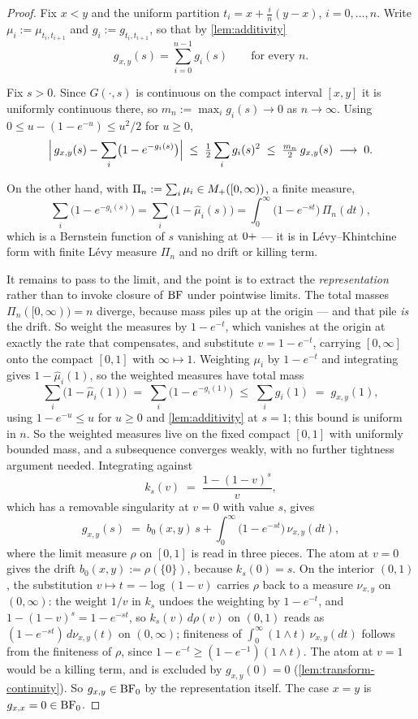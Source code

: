\begin{proof}
\leanok
Fix $x < y$ and the uniform partition $t_i = x + \tfrac{i}{n}(y - x)$, $i = 0, \dots, n$.
Write $\mu_i := \mu_{t_i, t_{i+1}}$ and $g_i := g_{t_i, t_{i+1}}$, so that by
\ref{lem:additivity}
\[
  g_{x,y}(s) = \sum_{i=0}^{n-1} g_i(s) \qquad \text{for every } n.
\]

Fix $s > 0$. Since $G(\cdot, s)$ is continuous on the compact interval $[x, y]$ it is
uniformly continuous there, so $m_n := \max_i g_i(s) \to 0$ as $n \to \infty$. Using
$0 \le u - (1 - e^{-u}) \le u^2/2$ for $u \ge 0$,
\[
  \Bigl|\, g_{x,y}(s) - \sum_{i}\bigl(1 - e^{-g_i(s)}\bigr) \Bigr|
  \;\le\; \tfrac12 \sum_i g_i(s)^2
  \;\le\; \tfrac{m_n}{2}\, g_{x,y}(s)
  \;\longrightarrow\; 0 .
\]

On the other hand, with $\Pi_n := \sum_i \mu_i \in M_+([0,\infty))$, a finite measure,
\[
  \sum_i \bigl(1 - e^{-g_i(s)}\bigr) = \sum_i \bigl(1 - \hat\mu_i(s)\bigr)
  = \int_0^\infty \bigl(1 - e^{-st}\bigr)\,\Pi_n(dt),
\]
which is a Bernstein function of $s$ vanishing at $0{+}$ --- it is in Lévy--Khintchine form
with finite Lévy measure $\Pi_n$ and no drift or killing term.

It remains to pass to the limit, and the point is to extract the \emph{representation} rather
than to invoke closure of $\mathrm{BF}$ under pointwise limits. The total masses $\Pi_n([0,\infty)) = n$
diverge, because mass piles up at the origin --- and that pile \emph{is} the drift. So weight the
measures by $1 - e^{-t}$, which vanishes at the origin at exactly the rate that compensates, and
substitute $v = 1 - e^{-t}$, carrying $[0,\infty]$ onto the compact $[0,1]$ with
$\infty \mapsto 1$. Weighting $\mu_i$ by $1 - e^{-t}$ and integrating gives $1 - \hat\mu_i(1)$, so
the weighted measures have total mass
\[
  \sum_i \bigl(1 - \hat\mu_i(1)\bigr) \;=\; \sum_i \bigl(1 - e^{-g_i(1)}\bigr)
  \;\le\; \sum_i g_i(1) \;=\; g_{x,y}(1),
\]
using $1 - e^{-u} \le u$ for $u \ge 0$ and \ref{lem:additivity} at $s = 1$; this bound is uniform
in $n$. So the weighted measures live on the fixed compact $[0,1]$ with uniformly bounded mass,
and a subsequence converges weakly, with no further tightness argument needed. Integrating
against
\[
  k_s(v) \;=\; \frac{1 - (1-v)^s}{v},
\]
which has a removable singularity at $v = 0$ with value $s$, gives
\[
  g_{x,y}(s) \;=\; b_0(x,y)\,s + \int_0^\infty \bigl(1 - e^{-st}\bigr)\,\nu_{x,y}(dt),
\]
where the limit measure $\rho$ on $[0,1]$ is read in three pieces. The atom at $v = 0$ gives the
drift $b_0(x,y) := \rho(\{0\})$, because $k_s(0) = s$. On the interior $(0,1)$, the substitution
$v \mapsto t = -\log(1-v)$ carries $\rho$ back to a measure $\nu_{x,y}$ on $(0,\infty)$: the
weight $1/v$ in $k_s$ undoes the weighting by $1 - e^{-t}$, and $1 - (1-v)^s = 1 - e^{-st}$, so
$k_s(v)\,d\rho(v)$ on $(0,1)$ reads as $(1 - e^{-st})\,d\nu_{x,y}(t)$ on $(0,\infty)$; finiteness
of $\int_0^\infty (1 \wedge t)\,\nu_{x,y}(dt)$ follows from the finiteness of $\rho$, since
$1 - e^{-t} \ge (1 - e^{-1})(1 \wedge t)$. The atom at $v = 1$ would be a killing term, and is
excluded by $g_{x,y}(0) = 0$ (\ref{lem:transform-continuity}). So $g_{x,y} \in \mathrm{BF}_0$ by the
representation itself.
The case $x = y$ is $g_{x,x} = 0 \in \mathrm{BF}_0$.
\end{proof}

